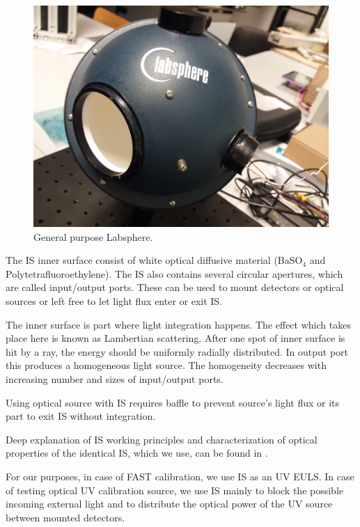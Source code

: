 \begin{figure}[H]
 \centering
 \includegraphics[scale=0.09, angle = 180]{./pictures/IntegrationSphere}
 \caption{General purpose Labsphere.}
 \label{Labsphere}
 
\end{figure}
\par
The IS inner surface consist of white optical diffusive material (BaSO$_4$ and Polytetrafluoroethylene). The IS also contains several circular apertures, which are called input/output ports. These can be used to mount detectors or optical sources or left free to let light flux enter or exit IS. 
\par
The inner surface is part where light integration happens. The effect which takes place here is known as Lambertian scattering. After one spot of inner surface is hit by a ray, the energy should be uniformly radially distributed. In output port this produces a homogeneous light source. The homogeneity decreases with increasing number and sizes of input/output ports.
\par
Using optical source with IS requires baffle to prevent source's light flux or its part to exit IS without integration.
\par
Deep explanation of IS working principles and characterization of optical properties of the identical IS, which we use, can be found in \cite{VACULA2021167169}.
\par
For our purposes, in case of FAST calibration, we use IS as an UV EULS. In case of testing optical UV calibration source, we use IS mainly to block the possible incoming external light and to distribute the optical power of the UV source between mounted detectors.

